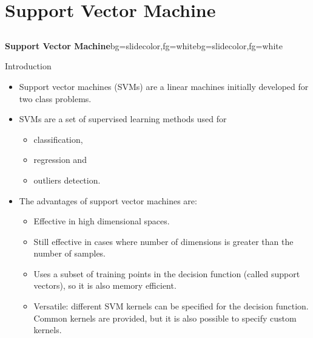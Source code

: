 \section{Support Vector Machine}
\subsection{}
\begin{frame}{}
\begin{variableblock}{\centering \Large \textbf{\vspace{4pt}\newline Support Vector Machine\vspace{4pt}}}{bg=slidecolor,fg=white}{bg=slidecolor,fg=white}
\end{variableblock}
\end{frame}

\begin{frame}{Introduction}
\begin{itemize}
\item Support vector machines (SVMs) are a linear machines initially developed for two class problems.
\item SVMs are a set of supervised learning methods used for 
\begin{itemize}
\item classification, 
\item regression and 
\item outliers detection.
\end{itemize}
\item The advantages of support vector machines are:
\begin{itemize}
\item Effective in high dimensional spaces.
\item Still effective in cases where number of dimensions is greater than the number of samples.
\item Uses a subset of training points in the decision function (called {\color{mycolor2}support vectors}), so it is also {\color{mycolor1}memory efficient}.
\item Versatile: different SVM kernels can be specified for the decision function. Common kernels are provided, but it is also possible to specify custom kernels.
\end{itemize}
\end{itemize}
\end{frame}


